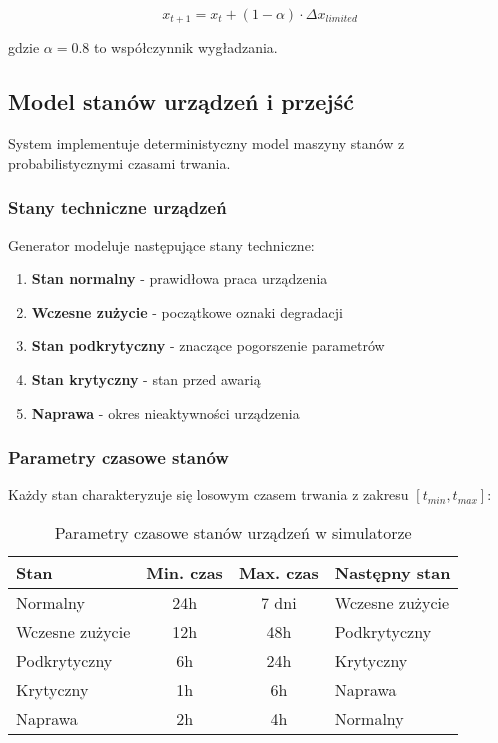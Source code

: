$$x_{t+1} = x_t + (1-\alpha) \cdot \Delta x_{limited}$$

gdzie $\alpha = 0.8$ to współczynnik wygładzania.

\subsection{Model stanów urządzeń i przejść}
\label{subsec:model_stanow}

System implementuje deterministyczny model maszyny stanów z probabilistycznymi czasami trwania.

\subsubsection{Stany techniczne urządzeń}

Generator modeluje następujące stany techniczne:

\begin{enumerate}
    \item \textbf{Stan normalny} - prawidłowa praca urządzenia
    \item \textbf{Wczesne zużycie} - początkowe oznaki degradacji
    \item \textbf{Stan podkrytyczny} - znaczące pogorszenie parametrów
    \item \textbf{Stan krytyczny} - stan przed awarią
    \item \textbf{Naprawa} - okres nieaktywności urządzenia
\end{enumerate}

\subsubsection{Parametry czasowe stanów}

Każdy stan charakteryzuje się losowym czasem trwania z zakresu $[t_{min}, t_{max}]$:

\begin{table}[h]
\centering
\begin{tabular}{|l|c|c|l|}
\hline
\textbf{Stan} & \textbf{Min. czas} & \textbf{Max. czas} & \textbf{Następny stan} \\
\hline
Normalny & 24h & 7 dni & Wczesne zużycie \\
Wczesne zużycie & 12h & 48h & Podkrytyczny \\
Podkrytyczny & 6h & 24h & Krytyczny \\
Krytyczny & 1h & 6h & Naprawa \\
Naprawa & 2h & 4h & Normalny \\
\hline
\end{tabular}
\caption{Parametry czasowe stanów urządzeń w simulatorze}
\label{tab:parametry_stanow_sim}
\end{table}

